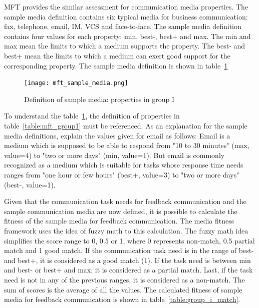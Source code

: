 \documentclass[english,12pt,a4paper,pdftex]{article}
\begin{document}
\ac{MFT} provides the similar assessment for communication media properties. The sample media definition contains six typical media for business communication: fax, telephone, email, \ac{IM}, \ac{VCS} and face-to-face. The sample media definition contains four values for each property: min, best-, best+ and max. The min and max mean the limits to which a medium supports the property. The best- and best+ mean the limits to which a medium can exert good support for the corresponding property. The sample media definition is shown in table~\ref{fig:mft_sample_media}

\begin{figure}[htb]
\begin{center}
\texttt{[image: mft\_sample\_media.png]}
\end{center}
\caption{Definition of sample media: properties in group I \citep{higa2007}}
\label{fig:mft_sample_media}
\end{figure}

To understand the table~\ref{fig:mft_sample_media}, the definition of properties in table~\ref{table:mft_group1} must be referenced. As an explanation for the sample media definitions, \citet{higa2007} explain the values given for email as follows: Email is a medium which is supposed to be able to respond from "10 to 30 minutes" (max, value=4) to "two or more days" (min, value=1). But email is commonly recognized as a medium which is suitable for tasks whose response time needs ranges from "one hour or few hours" (best+, value=3) to "two or more days" (best-, value=1).

Given that the communication task needs for feedback communication and the sample communication media are now defined, it is possible to calculate the fitness of the sample media for feedback communication. The media fitness framework uses the idea of fuzzy math to this calculation. The fuzzy math idea simplifies the score range to 0, 0.5 or 1, where 0 represents non-match, 0.5 partial match and 1 good match. If the communication task need is in the range of best- and best+, it is considered as a good match (1). If the task need is between min and best- or best+ and max, it is considered as a partial match. Last, if the task need is not in any of the previous ranges, it is considered as a non-match. The sum of scores is the average of all the values. The calculated fitness of sample media for feedback communication is shown in table~\ref{table:group_i_match}.
\end{document}

